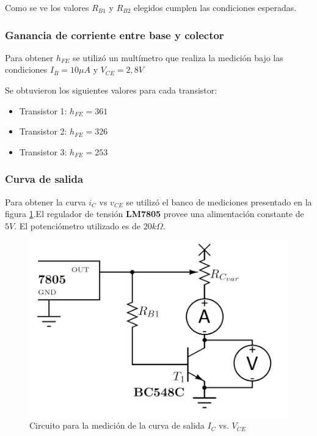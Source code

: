 \documentclass[10pt,spanish,a4paper,openany,notitlepage]{article}
\begin{document}
Como se ve los valores $R_{B1}$ y $R_{B2}$ elegidos cumplen las condiciones esperadas.

\subsubsection{Ganancia de corriente entre base y colector}

Para obtener $h_{FE}$ se utilizó un multímetro que realiza la medición bajo las condiciones $I_B = 10 \unit{\mu A}$ y $V_{CE} = 2,8 \unit{V}$

Se obtuvieron los siguientes valores para cada transistor:

\begin{itemize}
\item{Transistor 1:} $h_{FE} = 361$
\item{Transistor 2:} $h_{FE} = 326$
\item{Transistor 3:} $h_{FE} = 253$
\end{itemize}

\subsubsection{Curva de salida}

Para obtener la curva $i_C$ vs $v_{CE}$ se utilizó el banco de mediciones presentado en la figura \ref{circuito:medicion_salida}.El regulador de tensión \textbf{LM7805} provee una alimentación constante de $5\unit{V}$. El potenciómetro utilizado es de $20 \unit{k\Omega}$.

\begin{figure}[H] %
\begin{center}
\includegraphics[scale=0.2]{./imagenes/ic_vce.jpg}
\caption{Circuito para la medición de la curva de salida $I_C$ vs. $V_{CE}$}
 \label{circuito:medicion_salida}
\end{center}
\end{figure}
\end{document}
